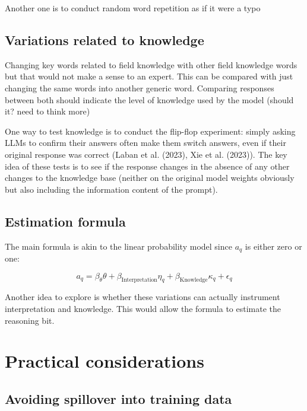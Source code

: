 \documentclass[
]{article}
\begin{document}
Another one is to conduct random word repetition as if it were a typo

\subsection{Variations related to
knowledge}\label{variations-related-to-knowledge}

Changing key words related to field knowledge with other field knowledge
words but that would not make a sense to an expert. This can be compared
with just changing the same words into another generic word. Comparing
responses between both should indicate the level of knowledge used by
the model (should it? need to think more)

One way to test knowledge is to conduct the flip-flop experiment: simply
asking LLMs to confirm their answers often make them switch answers,
even if their original response was correct (Laban et al. (2023), Xie et
al. (2023)). The key idea of these tests is to see if the response
changes in the absence of any other changes to the knowledge base
(neither on the original model weights obviously but also including the
information content of the prompt).

\subsection{Estimation formula}\label{estimation-formula}

The main formula is akin to the linear probability model since \(a_{q}\)
is either zero or one:

\[
a_{q} = \beta_{\theta} \theta + \beta_{\text{Interpretation}} \eta_q + \beta_{\text{Knowledge}} \kappa_q + \epsilon_q
\]

Another idea to explore is whether these variations can actually
instrument interpretation and knowledge. This would allow the formula to
estimate the reasoning bit.

\section{Practical considerations}\label{practical-considerations}

\subsection{Avoiding spillover into training
data}\label{avoiding-spillover-into-training-data}
\end{document}
